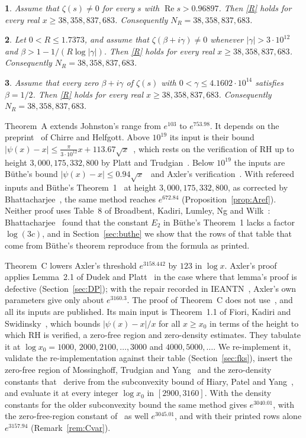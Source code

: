 \documentclass{amsart}
\theoremstyle{definition}
\theoremstyle{remark}
\theoremstyle{plain}
\newcommand{\lettername}{}
\newtheorem*{letteredthm*}{\lettername}
\newenvironment{lthm}[1]{\renewcommand{\lettername}{Theorem #1}\begin{letteredthm*}}{\end{letteredthm*}}
\numberwithin{equation}{section}
\newcommand{\NN}{38{,}358{,}837{,}683}
\newcommand{\HRH}{3{,}000{,}175{,}332{,}800}
\newcommand{\TDhyp}{4.1602\cdot10^{14}}
\newcommand{\Bp}{B$'$}
\newcommand{\Bstar}{B$^*$}
\begin{document}
\begin{lthm}{\Bstar}
Assume that $\zeta(s)\ne0$ for every $s$ with $\operatorname{Re}s>0.96897$. Then \eqref{R} holds for every real $x\ge\NN$. Consequently $N_R=\NN$.
\end{lthm}

\begin{lthm}{\Bp}
Let $0<R\le1.7373$, and assume that $\zeta(\beta+i\gamma)\ne0$ whenever $|\gamma|>3\cdot10^{12}$ and $\beta>1-1/(R\log|\gamma|)$. Then \eqref{R} holds for every real $x\ge\NN$. Consequently $N_R=\NN$.
\end{lthm}

\begin{lthm}{D}
Assume that every zero $\beta+i\gamma$ of $\zeta(s)$ with $0<\gamma\le\TDhyp$ satisfies $\beta=1/2$. Then \eqref{R} holds for every real $x\ge\NN$. Consequently $N_R=\NN$.
\end{lthm}

Theorem~A extends Johnston's range from $e^{103}$ to $e^{753.98}$. It depends on the preprint~\cite{CH25} of Chirre and Helfgott. Above $10^{19}$ its input is their bound $|\psi(x)-x|\le\frac{\pi}{3\cdot10^{12}}x+113.67\sqrt x$~\cite[Cor.~1.3]{CH25}, which rests on the verification of RH up to height $\HRH$ by Platt and Trudgian~\cite{PT21a}. Below $10^{19}$ the inputs are B\"uthe's bound $|\psi(x)-x|\le0.94\sqrt x$~\cite{But18} and Axler's verification~\cite{Ax17}. With refereed inputs and B\"uthe's Theorem~1~\cite{But16} at height $\HRH$, as corrected by Bhattacharjee~\cite{Bha24}, the same method reaches $e^{672.84}$ (Proposition~\ref{prop:Aref}). Neither proof uses Table~8 of Broadbent, Kadiri, Lumley, Ng and Wilk~\cite{BKLNW21}: Bhattacharjee~\cite{Bha24} found that the constant $E_2$ in B\"uthe's Theorem~1 lacks a factor $\log(3c)$, and in Section~\ref{sec:buthe} we show that the rows of that table that come from B\"uthe's theorem reproduce from the formula as printed.

Theorem~C lowers Axler's threshold $e^{3158.442}$ by $123$ in $\log x$. Axler's proof applies Lemma~2.1 of Dudek and Platt~\cite{DP15} in the case where that lemma's proof is defective (Section~\ref{sec:DP}); with the repair recorded in IEANTN~\cite{IEANTN}, Axler's own parameters give only about $e^{3160.3}$. The proof of Theorem~C does not use~\cite[Lemma~2.1]{DP15}, and all its inputs are published. Its main input is Theorem~1.1 of Fiori, Kadiri and Swidinsky~\cite{FKS23}, which bounds $|\psi(x)-x|/x$ for all $x\ge x_0$ in terms of the height to which RH is verified, a zero-free region and zero-density estimates. They tabulate it at $\log x_0=1000$, $2000,2100,\dots,3000$ and $4000,5000,\dots$. We re-implement it, validate the re-implementation against their table (Section~\ref{sec:fks}), insert the zero-free region of Mossinghoff, Trudgian and Yang~\cite{MTY23} and the zero-density constants that~\cite{FKS23} derive from the subconvexity bound of Hiary, Patel and Yang~\cite{HPY24}, and evaluate it at every integer $\log x_0$ in $[2900,3160]$. With the density constants for the older subconvexity bound the same method gives $e^{3040.01}$, with the zero-free-region constant of~\cite{FKS23} as well $e^{3045.01}$, and with their printed rows alone $e^{3157.94}$ (Remark~\ref{rem:Cvar}).
\end{document}

